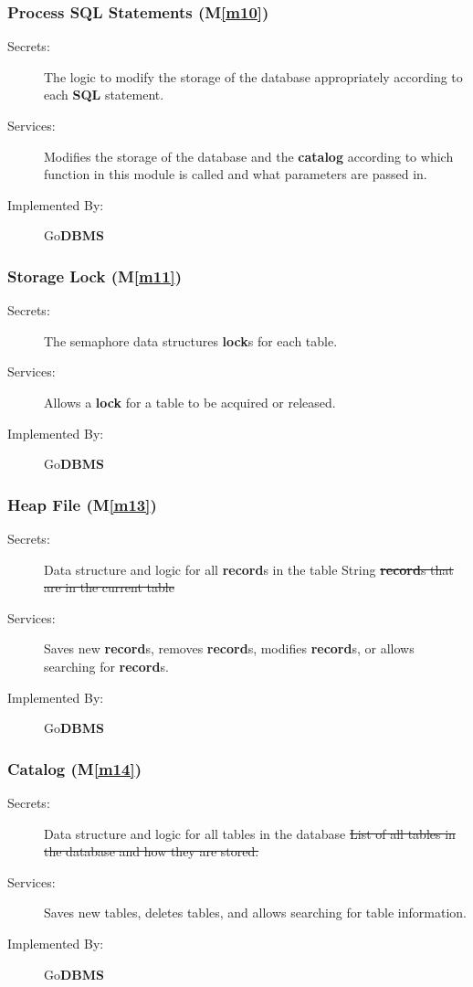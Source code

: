 \documentclass[12pt, titlepage]{article}
\newcommand{\mref}[1]{M\ref{#1}}
\begin{document}
\subsubsection{Process \textbf{SQL} Statements (\mref{m10})}
\begin{description}
\item[Secrets:]The logic to modify the storage of the database appropriately according to each \textbf{SQL} statement.
\item[Services:]Modifies the storage of the database and the \textbf{catalog} according to which function in this module is called and what parameters are passed in.
\item[Implemented By:] Go\textbf{DBMS}
\end{description}

\subsubsection{Storage Lock (\mref{m11})}
\begin{description}
\item[Secrets:]The semaphore {\color{red} data structures} \textbf{lock}s for each table.
\item[Services:]Allows a \textbf{lock} for a table to be acquired or released.
\item[Implemented By:] Go\textbf{DBMS}
\end{description}

\subsubsection{Heap File (\mref{m13})}
\begin{description}
\item[Secrets:] {\color{red} Data structure and logic for all \textbf{record}s in the table} String \sout{\textbf{record}s that are in the current table}
\item[Services:]Saves new \textbf{record}s, removes \textbf{record}s, modifies \textbf{record}s, or allows searching for \textbf{record}s.
\item[Implemented By:] Go\textbf{DBMS}
\end{description}

\subsubsection{\textbf{Catalog} (\mref{m14})}
\begin{description}
\item[Secrets:] {\color{red} Data structure and logic for all tables in the database} \sout{List of all tables in the database and how they are stored.}
\item[Services:]Saves new tables, deletes tables, and allows searching for table information.
\item[Implemented By:] Go\textbf{DBMS}
\end{description}
\end{document}
